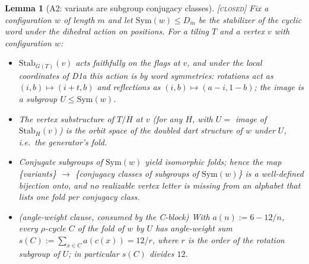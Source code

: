 \documentclass[11pt]{article}
\newtheorem{lemma}[theorem]{Lemma}
\theoremstyle{definition}
\newcommand{\CLOSED}{\textnormal{\textsc{[closed]}}}
\newcommand{\Stab}{\mathrm{Stab}}
\newcommand{\Sym}{\mathrm{Sym}}
\begin{document}
\begin{lemma}[A2: variants are subgroup conjugacy classes]\label{lem:A2} \CLOSED\;
Fix a configuration $w$ of length $m$ and let $\Sym(w) \le D_m$ be the stabilizer of the
cyclic word under the dihedral action on positions. For a tiling $T$ and a vertex $v$
with configuration $w$:
\begin{itemize}
\item[(i)] $\Stab_{G(T)}(v)$ acts faithfully on the flags at $v$, and under the local
  coordinates of D1a this action is by word symmetries: rotations act as
  $(i,b) \mapsto (i+t, b)$ and reflections as $(i,b) \mapsto (a-i, 1-b)$; the image is a
  subgroup $U \le \Sym(w)$.
\item[(ii)] The vertex substructure of $T/H$ at $v$ (for any $H$, with
  $U = $ image of $\Stab_H(v)$) is the orbit space of the doubled dart structure of $w$
  under $U$, i.e.\ the generator's fold.
\item[(iii)] Conjugate subgroups of $\Sym(w)$ yield isomorphic folds; hence the map
  \{variants\} $\to$ \{conjugacy classes of subgroups of $\Sym(w)$\} is a well-defined
  bijection onto, and no realizable vertex letter is missing from an alphabet that lists
  one fold per conjugacy class.
\item[(iv)] (angle-weight clause, consumed by the C-block) With $a(n) := 6 - 12/n$, every
  $\rho$-cycle $C$ of the fold of $w$ by $U$ has angle-weight sum
  $s(C) := \sum_{x \in C} a(c(x)) = 12/r$, where $r$ is the order of the rotation
  subgroup of $U$; in particular $s(C)$ divides $12$.
\end{itemize}
\end{lemma}
\end{document}
